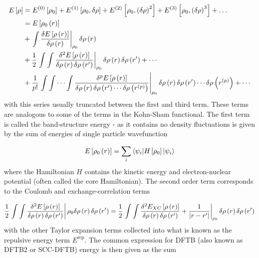 \begin{equation}
    \begin{split}
    E\left[\rho\right] &= E^{\left(0\right)}\left[\rho_0\right] + E^{\left(1\right)}\left[\rho_0, \delta\rho\right] + E^{\left(2\right)}\left[\rho_0, \left(\delta\rho\right)^2\right] + E^{\left(3\right)}\left[\rho_0, \left(\delta\rho\right)^3\right] + \dots \\
    &= E_{} \left[ \rho_0\left(r\right) \right] \\
    &+ \left. \int \frac{\delta E_{} \left[ \rho\left(r\right) \right]}{\delta \rho\left(r\right)} \right\rvert_{\rho_0}  \delta \rho \left( r \right) \\
    &+ \frac{1}{2} \left. \int\int \frac{\delta^2 E_{} \left[ \rho\left(r\right) \right]}{\delta \rho\left(r\right)\delta \rho\left(r^\prime\right)} \right\rvert_{\rho_0} \delta \rho \left( r \right) \delta \rho \left( r^\prime \right) + \cdots \\
    &+ \frac{1}{p!} \left. \int\int \cdots\int \frac{\delta^p E_{} \left[ \rho\left(r\right) \right]}{\delta \rho\left(r\right)\delta \rho\left(r^\prime\right) \cdots \delta \rho\left(r^{\left(p\right)}\right)} \right\rvert_{\rho_0} \delta \rho \left( r \right) \delta \rho \left( r^\prime \right) \cdots \delta \rho\left(r^{\left(p\right)}\right) + \cdots
    \end{split}
\end{equation}
%
with this series usually truncated between the first and third term\cite{Gaus2011, Koskinen2009}. 
These terms are analogous to some of the terms in the Kohn-Sham functional. The 
first term is called the band-structure energy - as it contains no density fluctuations
is given by the sum of energies of single particle wavefunction

\begin{equation}
    E_{} \left[ \rho_0\left(r\right) \right] =  \sum_i \braket{\psi_i|H_{} \left[ \rho_0 \right]|\psi_i}
\end{equation}
%
where the Hamiltonian $H$ contains the kinetic energy and electron-nuclear potential
(often called the core Hamiltonian). The second order term corresponds to the Coulomb 
and exchange-correlation terms

\begin{equation}
    \frac{1}{2} \left. \int\int \frac{\delta^2 E_{} \left[ \rho\left(r\right) \right]}{\delta \rho\left(r\right)\delta \rho\left(r^\prime\right)} \right\rvert {\rho_0} \delta \rho \left( r \right) \delta \rho \left( r^\prime \right) = \frac{1}{2} \left. \int\int \frac{\delta^2 E_{XC} \left[ \rho\left(r\right) \right]}{\delta \rho\left(r\right)\delta \rho\left(r^\prime\right)} + \frac{1}{\left\lvert r-r^\prime \right\rvert} \right\rvert_{\rho_0} \delta \rho \left( r \right) \delta \rho \left( r^\prime \right)
\end{equation}
%
with the other Taylor expansion terms collected into what is known as the repulsive
energy term $E^\text{rep}$. The common expression for DFTB (also known as DFTB2
or SCC-DFTB\cite{Elstner1998}) energy is then given as the sum

